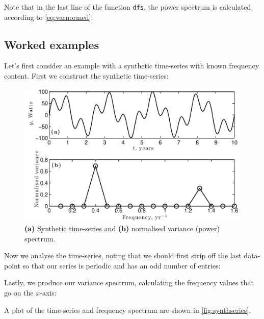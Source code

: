 \documentclass[11pt,twoside,a4paper]{article}
\begin{document}
Note that in the last line of the function \texttt{dfs}, the power
spectrum is calculated according to \autoref{eq:varnormed}. 

\subsection{Worked examples}

Let's first consider an example with a synthetic time-series with
known frequency content.  First we construct the synthetic
time-series:

\begin{figure}[bt]
  \centering
  \includegraphics[width=5in]{../figs/L15/SeriesAndSpectrum_1}
  \caption{\textbf{(a)} Synthetic time-series and \textbf{(b)}
    normalised variance (power) spectrum.}
  \label{fig:synthseries}
\end{figure}

Now we analyse the time-series, noting that we should first strip off
the last data-point so that our series is periodic and has an odd number
of entries:

Lastly, we produce our variance spectrum, calculating the frequency
values that go on the $x$-axis:

A plot of the time-series and frequency spectrum are shown in
\autoref{fig:synthseries}.
\end{document}
